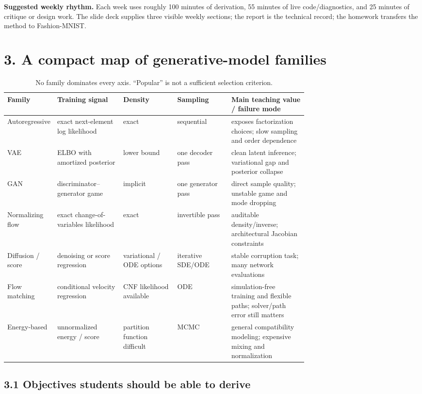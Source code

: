 \documentclass[11pt]{article}
\begin{document}
\textbf{Suggested weekly rhythm.} Each week uses roughly 100 minutes of
derivation, 55 minutes of live code/diagnostics, and 25 minutes of critique or
design work. The slide deck supplies three visible weekly sections; the report is
the technical record; the homework transfers the method to Fashion-MNIST.

\section*{3. A compact map of generative-model families}

\begin{table}[H]
\centering
\small
\begin{tabularx}{\linewidth}{p{0.14\linewidth}p{0.22\linewidth}p{0.18\linewidth}p{0.18\linewidth}X}
\toprule
Family & Training signal & Density & Sampling & Main teaching value / failure mode \\
\midrule
Autoregressive & exact next-element log likelihood & exact & sequential & exposes
factorization choices; slow sampling and order dependence \\
VAE & ELBO with amortized posterior & lower bound & one decoder pass & clean latent
inference; variational gap and posterior collapse \\
GAN & discriminator--generator game & implicit & one generator pass & direct sample
quality; unstable game and mode dropping \\
Normalizing flow & exact change-of-variables likelihood & exact & invertible pass &
auditable density/inverse; architectural Jacobian constraints \\
Diffusion / score & denoising or score regression & variational / ODE options &
iterative SDE/ODE & stable corruption task; many network evaluations \\
Flow matching & conditional velocity regression & CNF likelihood available & ODE &
simulation-free training and flexible paths; solver/path error still matters \\
Energy-based & unnormalized energy / score & partition function difficult & MCMC &
general compatibility modeling; expensive mixing and normalization \\
\bottomrule
\end{tabularx}
\caption{No family dominates every axis. ``Popular'' is not a sufficient selection criterion.}
\end{table}

\subsection*{3.1 Objectives students should be able to derive}
\end{document}
